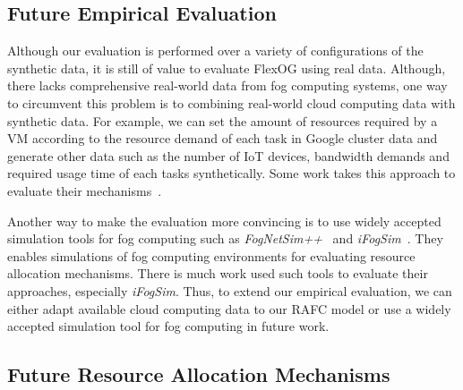 \documentclass[11pt]{phdthesis}
\begin{document}
\subsection{Future Empirical Evaluation} \label{future empirical evaluation}

Although our evaluation is performed over a variety of configurations of the synthetic data, it is still of value to evaluate FlexOG using real data. Although, there lacks comprehensive real-world data from fog computing systems, one way to circumvent this problem is to combining real-world cloud computing data with synthetic data. For example, we can set the amount of resources required by a VM according to the resource demand of each task in Google cluster data and generate other data such as the number of IoT devices, bandwidth demands and required usage time of each tasks synthetically. Some work takes this approach to evaluate their mechanisms~\citep{zhang2015truthful,shi2017online}. 

Another way to make the evaluation more convincing is to use widely accepted simulation tools for fog computing such as \textit{FogNetSim++}~\citep{qayyum2018fognetsim++} and \textit{iFogSim}~\citep{gupta2017ifogsim}. They enables simulations of fog computing environments for evaluating resource allocation mechanisms. There is much work used such tools to evaluate their approaches, especially \textit{iFogSim}\citep{rahbari2017scheduling,taneja2017resource}. Thus, to extend our empirical evaluation, we can either adapt available cloud computing data to our RAFC model or use a widely accepted simulation tool for fog computing in future work. 


\subsection{Future Resource Allocation Mechanisms} \label{future resource allocation mechanisms}
\end{document}

